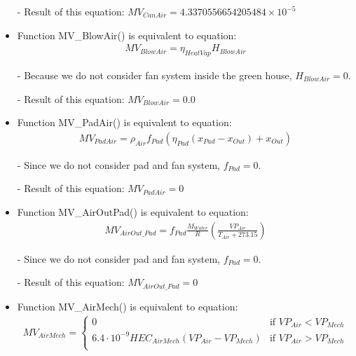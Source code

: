 \documentclass[a4paper]{article}
\numberwithin{equation}{section}
\begin{document}
\begin{itemize}
  \item[-] Result of this equation: \(MV_{CanAir} = 4.3370556654205484 \times 10^{-5}\)

  \item Function MV\_BlowAir() is equivalent to equation:
        \begin{align*}
          MV_{BlowAir} = \eta_{HeatVap} H_{BlowAir}
        \end{align*}

  \item[-] Because we do not consider fan system inside the green house, \(H_{BlowAir} = 0\).
  \item[-] Result of this equation: \(MV_{BlowAir} = 0.0\)

  \item Function MV\_PadAir() is equivalent to equation:
        \begin{align*}
          MV_{PadAir} = \rho_{Air} f_{Pad} (\eta_{Pad} (x_{Pad} - x_{Out}) + x_{Out})
        \end{align*}

  \item[-] Since we do not consider pad and fan system, \(f_{Pad} = 0\).
  \item[-] Result of this equation: \(MV_{PadAir} = 0\)

  \item Function MV\_AirOutPad() is equivalent to equation:
        \begin{align*}
          MV_{AirOut\_Pad} = f_{Pad}
          \frac{M_{Water}}{R} \left(\frac{VP_{Air}}{T_{Air} + 273.15}\right)
        \end{align*}

  \item[-] Since we do not consider pad and fan system, \(f_{Pad} = 0\).
  \item[-] Result of this equation: \(MV_{AirOut\_Pad} = 0\)

  \item Function MV\_AirMech() is equivalent to equation:
        \begin{align*}
          MV_{AirMech} = \begin{cases}
            0                                                     & \text{if~} VP_{Air} < VP_{Mech} \\
            6.4 \cdot 10^{-9} HEC_{AirMech}(VP_{Air} - VP_{Mech}) & \text{if~} VP_{Air} > VP_{Mech} \\
          \end{cases}
        \end{align*}


\end{itemize}
\end{document}
